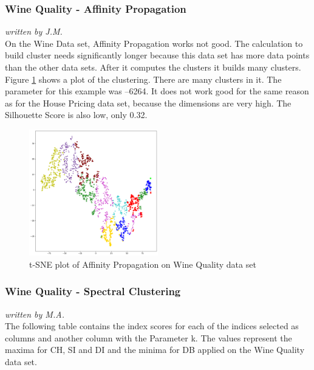 \subsubsection{Wine Quality - Affinity Propagation}
\textit{written by J.M.}\\

On the Wine Data set, Affinity Propagation works not good. The calculation to build cluster needs significantly longer because this data set has more data points than the other data sets. After it computes the clusters it builds many clusters. Figure \ref{fig:af_wine1} shows a plot of the clustering. There are many clusters in it. The parameter for this example was –6264. It does not work good for the same reason as for the House Pricing data set, because the dimensions are very high. The Silhouette Score is also low, only 0.32. 

\begin{figure}[H]
	\begin{center}
		\includegraphics[width=0.5\textwidth]{images/af_wine6533.png}
	\end{center}
	\caption{t-SNE plot of Affinity Propagation on Wine Quality data set}
	\label{fig:af_wine1}
\end{figure}


\subsubsection{Wine Quality - Spectral Clustering}
\textit{written by M.A.}\\

The following table contains the index scores for each of the indices selected as columns and another column with the Parameter k. The values represent the maxima for CH, SI and DI and the minima for DB applied on the Wine Quality data set.\newline  
  


